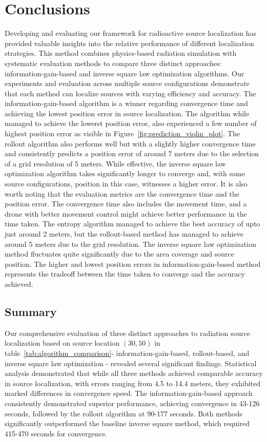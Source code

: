 \documentclass[../report.tex]{subfiles}
\begin{document}
    \section{Conclusions}
    \label{sec:conclusions}
    Developing and evaluating our framework for radioactive source localization has provided valuable insights into the relative performance of different 
    localization strategies. This method combines physics-based radiation simulation with systematic evaluation methods to compare three distinct approaches: information-gain-based
    and inverse square law optimization algorithms. Our experiments and evaluation across multiple source configurations demonstrate that each method can localize sources with
    varying efficiency and accuracy. The information-gain-based algorithm is a winner regarding convergence time and achieving the lowest
    position error in source localization. The algorithm while managed to achieve the lowerst position error, also experienced a few number of highest position error as visible in Figure~\ref{fig:prediction_violin_plot}. 
    The rollout algorithm also performs well but with a slightly higher convergence time and consistently predicts a position error of around 7 meters due to the selection of a grid resolution of 5 meters. While effective, the inverse square law optimization algorithm 
    takes significantly longer to converge and, with some source configurations, position in this case, witnesses a higher error. It is also worth noting that the evaluation metrics are the convergence time and the position error. The convergence time also includes the movement time, and a 
    drone with better movement control might achieve better performance in the time taken. The entropy algorithm managed to achieve the best accuracy of upto
    just around 2 meters, but the rollout-based method has managed to achieve around 5 meters due to the grid resolution. The inverse square law optimization 
    method fluctuates quite significantly due to the area coverage and source position. The higher and lowest position errors in information-gain-based method represents the tradeoff between 
    the time taken to converge and the accuracy achieved. 

    \subsection{Summary}
    \label{sec:conclusions:summary}

    Our comprehensive evaluation of three distinct approaches to radiation source localization based on source location $(30,50)$ in 
    table~\ref{tab:algorithm_comparison}- information-gain-based, rollout-based, and inverse square law 
    optimization - revealed several significant findings. Statistical analysis demonstrated that while all three methods achieved comparable accuracy in source 
    localization, with errors ranging from 4.5 to 14.4 meters, they exhibited marked differences in convergence speed. The information-gain-based approach 
    consistently demonstrated superior performance, achieving convergence in 43-126 seconds, followed by the rollout algorithm at 90-177 seconds. Both methods 
    significantly outperformed the baseline inverse square method, which required 415-470 seconds for convergence.
\end{document}
